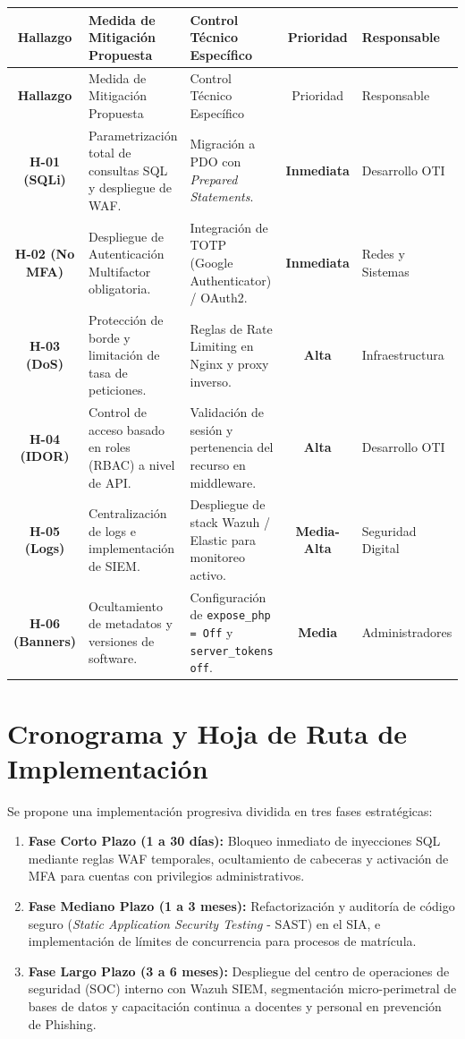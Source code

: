 \begin{center}
\small
\begin{longtable}{>{\bfseries}c p{4.5cm} p{4.0cm} c p{2.2cm}}
\toprule
\rowcolor{outermarginbgcolor}
Hallazgo & Medida de Mitigación Propuesta & Control Técnico Específico & Prioridad & Responsable \\
\midrule
\endfirsthead
\toprule
\rowcolor{outermarginbgcolor}
Hallazgo & Medida de Mitigación Propuesta & Control Técnico Específico & Prioridad & Responsable \\
\midrule
\endhead
\bottomrule
\endfoot
H-01 (SQLi) & Parametrización total de consultas SQL y despliegue de WAF. & Migración a PDO con \textit{Prepared Statements}. & \textbf{Inmediata} & Desarrollo OTI \\
\midrule
H-02 (No MFA) & Despliegue de Autenticación Multifactor obligatoria. & Integración de TOTP (Google Authenticator) / OAuth2. & \textbf{Inmediata} & Redes y Sistemas \\
\midrule
H-03 (DoS) & Protección de borde y limitación de tasa de peticiones. & Reglas de Rate Limiting en Nginx y proxy inverso. & \textbf{Alta} & Infraestructura \\
\midrule
H-04 (IDOR) & Control de acceso basado en roles (RBAC) a nivel de API. & Validación de sesión y pertenencia del recurso en middleware. & \textbf{Alta} & Desarrollo OTI \\
\midrule
H-05 (Logs) & Centralización de logs e implementación de SIEM. & Despliegue de stack Wazuh / Elastic para monitoreo activo. & \textbf{Media-Alta} & Seguridad Digital \\
\midrule
H-06 (Banners) & Ocultamiento de metadatos y versiones de software. & Configuración de \texttt{expose\_php = Off} y \texttt{server\_tokens off}. & \textbf{Media} & Administradores \\
\bottomrule
\end{longtable}
\end{center}

\section{Cronograma y Hoja de Ruta de Implementación}
Se propone una implementación progresiva dividida en tres fases estratégicas:
\begin{enumerate}
    \item \textbf{Fase Corto Plazo (1 a 30 días):} Bloqueo inmediato de inyecciones SQL mediante reglas WAF temporales, ocultamiento de cabeceras y activación de MFA para cuentas con privilegios administrativos.
    \item \textbf{Fase Mediano Plazo (1 a 3 meses):} Refactorización y auditoría de código seguro (\textit{Static Application Security Testing} - SAST) en el SIA, e implementación de límites de concurrencia para procesos de matrícula.
    \item \textbf{Fase Largo Plazo (3 a 6 meses):} Despliegue del centro de operaciones de seguridad (SOC) interno con Wazuh SIEM, segmentación micro-perimetral de bases de datos y capacitación continua a docentes y personal en prevención de Phishing.
\end{enumerate}
